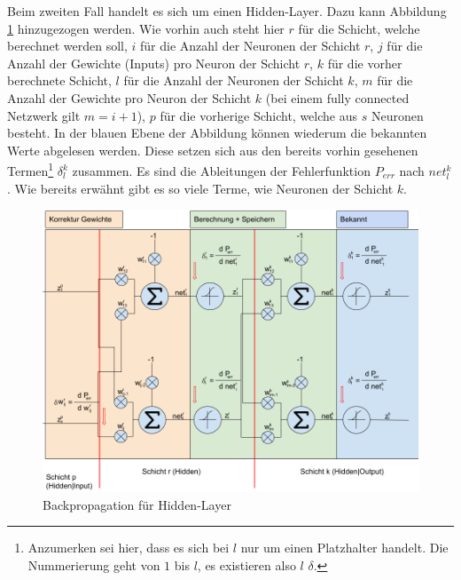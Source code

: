 \newpage
Beim zweiten Fall handelt es sich um einen Hidden-Layer. Dazu kann Abbildung \ref{fig:09_backpropagation_hidden} hinzugezogen
werden. Wie vorhin auch steht hier $r$ für die Schicht, welche berechnet werden soll, $i$ für die Anzahl der Neuronen
der Schicht $r$, $j$ für die Anzahl der Gewichte (Inputs) pro Neuron der Schicht $r$, $k$ für die vorher berechnete
Schicht, $l$ für die Anzahl der Neuronen der Schicht $k$, $m$ für die Anzahl der Gewichte pro Neuron der Schicht $k$ (bei einem
\glqq fully connected Netzwerk\grqq{} gilt $m = i + 1$), $p$ für die vorherige Schicht, welche aus $s$ Neuronen besteht.
In der blauen Ebene der Abbildung können wiederum die bekannten Werte abgelesen werden.
Diese setzen sich aus den bereits vorhin gesehenen Termen\footnote{Anzumerken sei hier, dass es sich bei $l$ nur
um einen Platzhalter handelt. Die Nummerierung geht von $1$ bis $l$, es existieren also $l$ $\delta$.} $\delta_l^k$ zusammen. Es sind die Ableitungen der
Fehlerfunktion $P_{err}$ nach $net_l^k$. Wie bereits erwähnt gibt es so viele Terme, wie Neuronen der Schicht $k$.
\begin{figure}[h!]
    \begin{center}
        \includegraphics[width=1\linewidth]{../common/01_neuronal_network/00_resources/05_backpropagation_hidden.png}
    \end{center}
    \caption{Backpropagation für Hidden-Layer}
    \label{fig:09_backpropagation_hidden}
\end{figure}


